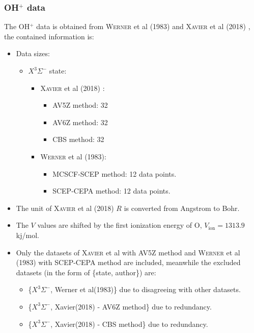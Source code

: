 \documentclass[12pt]{article}
\begin{document}
\subsubsection{OH$^+$ data}
The OH$^+$ data is obtained from \textsc{Werner} et al (1983) \cite{idx171} and \textsc{Xavier} et al (2018) \cite{idx174}, the contained information is:
\begin{itemize}
    \item Data sizes:
    \begin{itemize}
        \item $X^3\Sigma^-$ state:
        \begin{itemize}
            \item \textsc{Xavier} et al (2018) \cite{idx174}:
            \begin{itemize} 
                \item AV5Z method: 32
                \item AV6Z method: 32
                \item CBS method: 32
            \end{itemize}
            \item \textsc{Werner} et al (1983):
            \begin{itemize}
                \item MCSCF-SCEP method: 12 data points.
                \item SCEP-CEPA method: 12 data points.
            \end{itemize}
        \end{itemize}
    \end{itemize}
    \item The unit of \textsc{Xavier} et al (2018) \cite{idx174} $R$ is converted from Angstrom to Bohr.
    \item The $V$ values are shifted by the first ionization energy of O, $V_{\text{ion}} = 1313.9$ kj/mol.
    \item Only the datasets of \textsc{Xavier} et al \cite{idx174} with AV5Z method and \textsc{Werner} et al (1983) with SCEP-CEPA method are included, meanwhile the excluded datasets (in the form of \{state, author\}) are:
    \begin{itemize}
        \item \{$X^3\Sigma^-$, Werner et al(1983)\} due to disagreeing with other datasets.
        \item \{$X^3\Sigma^-$, Xavier(2018) - AV6Z method\} due to redundancy.
        \item \{$X^3\Sigma^-$, Xavier(2018) - CBS method\} due to redundancy.
    \end{itemize}
\end{itemize}
\end{document}
